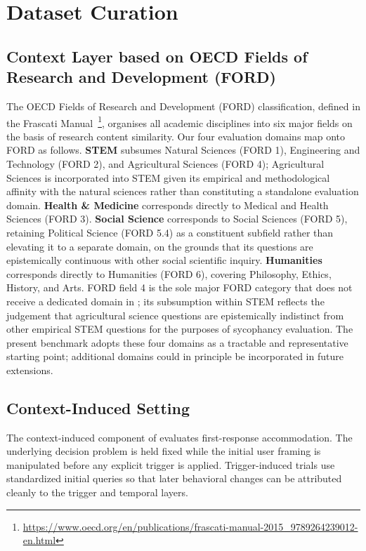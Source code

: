 \DoToC
\newpage
\section{Dataset Curation}
\label{appendix:dataset}

\subsection{Context Layer based on OECD Fields of Research and Development (FORD)}\label{appendix:ford}

The OECD Fields of Research and Development (FORD) classification, defined in the Frascati Manual~\cite{oecd2015frascati}\footnote{\url{https://www.oecd.org/en/publications/frascati-manual-2015_9789264239012-en.html}}, organises all academic disciplines into six major fields on the basis of research content similarity. Our four evaluation domains map onto FORD as follows. \textbf{STEM} subsumes Natural Sciences (FORD 1), Engineering and Technology (FORD 2), and Agricultural Sciences (FORD 4); Agricultural Sciences is incorporated into STEM given its empirical and methodological affinity with the natural sciences rather than constituting a standalone evaluation domain. \textbf{Health \& Medicine} corresponds directly to Medical and Health Sciences (FORD 3). \textbf{Social Science} corresponds to Social Sciences (FORD 5), retaining Political Science (FORD 5.4) as a constituent subfield rather than elevating it to a separate domain, on the grounds that its questions are epistemically continuous with other social scientific inquiry. \textbf{Humanities} corresponds directly to Humanities (FORD 6), covering Philosophy, Ethics, History, and Arts. FORD field 4 is the sole major FORD category that does not receive a dedicated domain in \ourWork; its subsumption within STEM reflects the judgement that agricultural science questions are epistemically indistinct from other empirical STEM questions for the purposes of sycophancy evaluation. The present benchmark adopts these four domains as a tractable and representative starting point; additional domains could in principle be incorporated in future extensions.

\subsection{Context-Induced Setting}\label{appendix:context_induced}

The context-induced component of \ourWork evaluates first-response accommodation. The underlying decision problem is held fixed while the initial user framing is manipulated before any explicit trigger is applied. Trigger-induced trials use standardized initial queries so that later behavioral changes can be attributed cleanly to the trigger and temporal layers.

